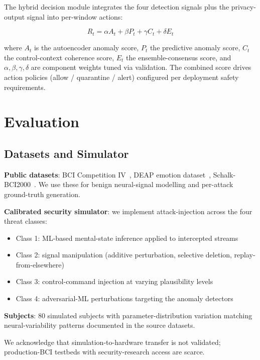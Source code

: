 \documentclass[sigconf,nonacm]{acmart}
\begin{document}
The hybrid decision module integrates the four detection signals
plus the privacy-output signal into per-window actions:

\begin{equation}
  R_t = \alpha A_t + \beta P_t + \gamma C_t + \delta E_t
\end{equation}

where $A_t$ is the autoencoder anomaly score, $P_t$ the predictive
anomaly score, $C_t$ the control-context coherence score, $E_t$
the ensemble-consensus score, and $\alpha, \beta, \gamma, \delta$
are component weights tuned via validation. The combined score
drives action policies (allow / quarantine / alert) configured per
deployment safety requirements.

\section{Evaluation}

\subsection{Datasets and Simulator}

\textbf{Public datasets}: BCI Competition IV~\cite{tangermann2012bci},
DEAP emotion dataset~\cite{koelstra2012deap},
Schalk-BCI2000~\cite{schalk2004bci2000}. We use these for benign
neural-signal modelling and per-attack ground-truth generation.

\textbf{Calibrated security simulator}: we implement attack-injection
across the four threat classes:
\begin{itemize}
  \item Class 1: ML-based mental-state inference applied to
        intercepted streams
  \item Class 2: signal manipulation (additive perturbation,
        selective deletion, replay-from-elsewhere)
  \item Class 3: control-command injection at varying
        plausibility levels
  \item Class 4: adversarial-ML perturbations targeting the
        anomaly detectors
\end{itemize}

\textbf{Subjects}: 80 simulated subjects with
parameter-distribution variation matching neural-variability
patterns documented in the source datasets.

We acknowledge that simulation-to-hardware transfer is not
validated; production-BCI testbeds with security-research access
are scarce.
\end{document}
